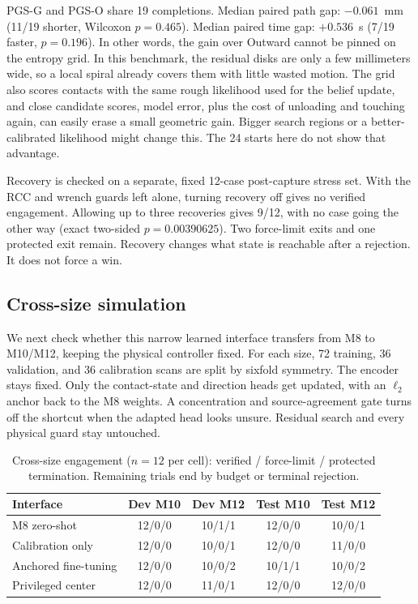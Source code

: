 \documentclass[letterpaper,10 pt,conference]{ieeeconf}
\newcommand{\pgso}{\textsc{PGS-O}}
\newcommand{\pgsg}{\textsc{PGS-G}}
\begin{document}
\pgsg{} and \pgso{} share 19 completions.  Median paired path gap:
$-0.061$~mm (11/19 shorter, Wilcoxon $p=0.465$).  Median paired time gap:
$+0.536$~s (7/19 faster, $p=0.196$).  In other words, the gain over Outward
cannot be pinned on the entropy grid.  In this benchmark, the residual
disks are only a few millimeters wide, so a local spiral already covers
them with little wasted motion.  The grid also scores contacts with the
same rough likelihood used for the belief update, and close candidate
scores, model error, plus the cost of unloading and touching again, can
easily erase a small geometric gain.  Bigger search regions or a
better-calibrated likelihood might change this.  The 24 starts here do not
show that advantage.

Recovery is checked on a separate, fixed 12-case post-capture stress set.
With the RCC and wrench guards left alone, turning recovery off gives no
verified engagement.  Allowing up to three recoveries gives 9/12, with no
case going the other way (exact two-sided $p=0.00390625$).  Two force-limit
exits and one protected exit remain.  Recovery changes what state is
reachable after a rejection.  It does not force a win.

\subsection{Cross-size simulation}

We next check whether this narrow learned interface transfers from M8 to
M10/M12, keeping the physical controller fixed.  For each size, 72
training, 36 validation, and 36 calibration scans are split by sixfold
symmetry.  The encoder stays fixed.  Only the contact-state and direction
heads get updated, with an $\ell_2$ anchor back to the M8 weights.  A
concentration and source-agreement gate turns off the shortcut when the
adapted head looks unsure.  Residual search and every physical guard stay
untouched.

\begin{table}[t]
\caption{Cross-size engagement ($n=12$ per cell): verified / force-limit /
protected termination.  Remaining trials end by budget or terminal rejection.}
\label{tab:cross_size}
\centering
\scriptsize
\setlength{\tabcolsep}{2.4pt}
\begin{tabular}{@{}lcccc@{}}
\toprule
Interface & Dev M10 & Dev M12 & Test M10 & Test M12\\
\midrule
M8 zero-shot & 12/0/0 & 10/1/1 & 12/0/0 & 10/0/1\\
Calibration only & 12/0/0 & 10/0/1 & 12/0/0 & 11/0/0\\
Anchored fine-tuning & 12/0/0 & 10/0/2 & 10/1/1 & 10/0/2\\
Privileged center & 12/0/0 & 11/0/1 & 12/0/0 & 12/0/0\\
\bottomrule
\end{tabular}
\end{table}
\end{document}
